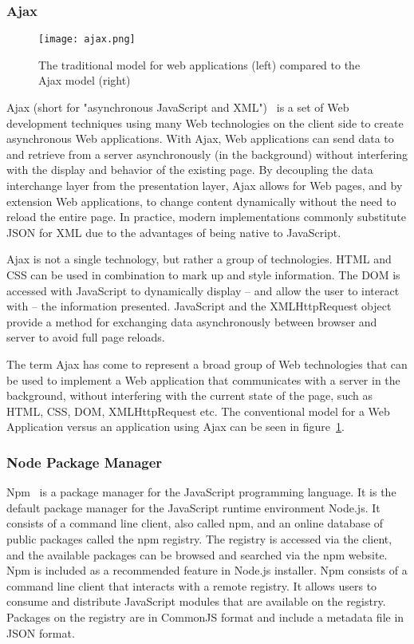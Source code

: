 \subsubsection{Ajax}
\label{ajax}
\begin{figure}
	\centerline{\texttt{[image: ajax.png]}}
	\caption{The traditional model for web applications (left) compared to the Ajax model (right)}
	\label{ajaxPNG}
\end{figure}
Ajax (short for "asynchronous JavaScript and XML")~\cite{garrett2005ajax} is a set of Web development techniques using many Web technologies on the client side to create asynchronous Web applications. With Ajax, Web applications can send data to and retrieve from a server asynchronously (in the background) without interfering with the display and behavior of the existing page. By decoupling the data interchange layer from the presentation layer, Ajax allows for Web pages, and by extension Web applications, to change content dynamically without the need to reload the entire page. In practice, modern implementations commonly substitute JSON for XML due to the advantages of being native to JavaScript.\par
Ajax is not a single technology, but rather a group of technologies. HTML and CSS can be used in combination to mark up and style information. The DOM is accessed with JavaScript to dynamically display – and allow the user to interact with – the information presented. JavaScript and the XMLHttpRequest object provide a method for exchanging data asynchronously between browser and server to avoid full page reloads.\par 
The term Ajax has come to represent a broad group of Web technologies that can be used to implement a Web application that communicates with a server in the background, without interfering with the current state of the page, such as HTML, CSS, DOM, XMLHttpRequest etc. The conventional model for a Web Application versus an application using Ajax can be seen in figure~\ref{ajaxPNG}.

\subsubsection{Node Package Manager}
Npm~\cite{schlueternode} is a package manager for the JavaScript programming language. It is the default package manager for the JavaScript runtime environment Node.js. It consists of a command line client, also called npm, and an online database of public packages called the npm registry. The registry is accessed via the client, and the available packages can be browsed and searched via the npm website. Npm is included as a recommended feature in Node.js installer. Npm consists of a command line client that interacts with a remote registry. It allows users to consume and distribute JavaScript modules that are available on the registry. Packages on the registry are in CommonJS format and include a metadata file in JSON format.

